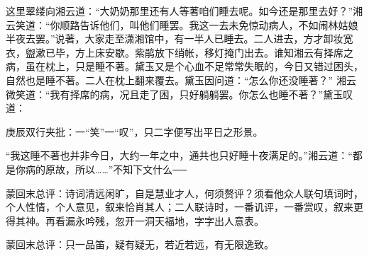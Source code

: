 \begin{parag}
    这里翠缕向湘云道：“大奶奶那里还有人等著咱们睡去呢。如今还是那里去好？”湘云笑道：“你顺路告诉他们，叫他们睡罢。我这一去未免惊动病人，不如闹林姑娘半夜去罢。”说著，大家走至潇湘馆中，有一半人已睡去。二人进去，方才卸妆宽衣，盥漱已毕，方上床安歇。紫鹃放下绡帐，移灯掩门出去。谁知湘云有择席之病，虽在枕上，只是睡不著。黛玉又是个心血不足常常失眠的，今日又错过困头，自然也是睡不著。二人在枕上翻来覆去。黛玉因问道：“怎么你还没睡著？” 湘云微笑道：“我有择席的病，况且走了困，只好躺躺罢。你怎么也睡不著？”黛玉叹道：\begin{note}庚辰双行夹批：一“笑”一“叹”，只二字便写出平日之形景。\end{note}“我这睡不著也并非今日，大约一年之中，通共也只好睡十夜满足的。”湘云道：“都是你病的原故，所以……”不知下文什么──
\end{parag}


\begin{parag}
    \begin{note}蒙回末总评：诗词清远闲旷，自是慧业才人，何须赘评？须看他众人联句填词时，个人性情，个人意见，叙来恰肖其人；二人联诗时，一番讥评，一番赏叹，叙来更得其神。再看漏永吟残，忽开一洞天福地，字字出人意表。\end{note}
\end{parag}


\begin{parag}
    \begin{note}蒙回末总评：只一品笛，疑有疑无，若近若远，有无限逸致。\end{note}
\end{parag}
